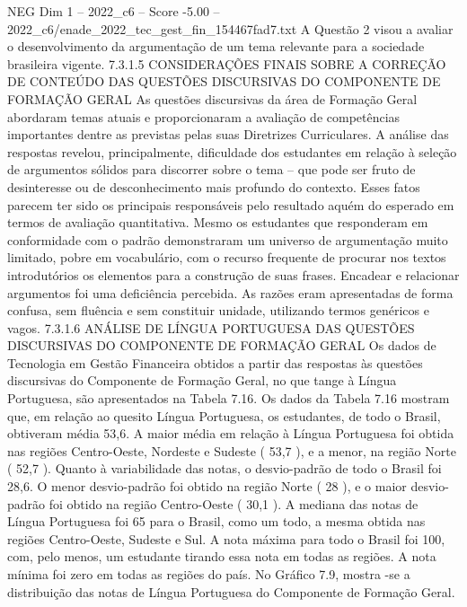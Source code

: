 \begin{textsample}{NEG Dim 1 – 2022\_c6 – Score -5.00 – 2022\_c6/enade\_2022\_tec\_gest\_fin\_154467fad7.txt}
A Questão 2 visou a avaliar o desenvolvimento da argumentação de um tema relevante para a sociedade brasileira vigente. 7.3.1.5 CONSIDERAÇÕES FINAIS SOBRE A CORREÇÃO DE CONTEÚDO DAS QUESTÕES DISCURSIVAS DO COMPONENTE DE FORMAÇÃO GERAL As questões discursivas da área de Formação Geral abordaram temas atuais e proporcionaram a avaliação de competências importantes dentre as previstas pelas suas Diretrizes Curriculares.
A análise das respostas revelou, principalmente, dificuldade dos estudantes em relação à seleção de argumentos sólidos para discorrer sobre o tema – que pode ser fruto de desinteresse ou de desconhecimento mais profundo do contexto.
Esses fatos parecem ter sido os principais responsáveis pelo resultado aquém do esperado em termos de avaliação quantitativa.
Mesmo os estudantes que responderam em conformidade com o padrão demonstraram um universo de argumentação muito limitado, pobre em vocabulário, com o recurso frequente de procurar nos textos introdutórios os elementos para a construção de suas frases.
Encadear e relacionar argumentos foi uma deficiência percebida.
As razões eram apresentadas de forma confusa, sem fluência e sem constituir unidade, utilizando termos genéricos e vagos. 7.3.1.6 ANÁLISE DE LÍNGUA PORTUGUESA DAS QUESTÕES DISCURSIVAS DO COMPONENTE DE FORMAÇÃO GERAL Os dados de Tecnologia em Gestão Financeira obtidos a partir das respostas às questões discursivas do Componente de Formação Geral, no que tange à Língua Portuguesa, são apresentados na Tabela 7.16.
Os dados da Tabela 7.16 mostram que, em relação ao quesito Língua Portuguesa, os estudantes, de todo o Brasil, obtiveram média 53,6.
A maior média em relação à Língua Portuguesa foi obtida nas regiões Centro-Oeste, Nordeste e Sudeste ( 53,7 ), e a menor, na região Norte ( 52,7 ).
Quanto à variabilidade das notas, o desvio-padrão de todo o Brasil foi 28,6.
O menor desvio-padrão foi obtido na região Norte ( 28 ), e o maior desvio-padrão foi obtido na região Centro-Oeste ( 30,1 ).
A mediana das notas de Língua Portuguesa foi 65 para o Brasil, como um todo, a mesma obtida nas regiões Centro-Oeste, Sudeste e Sul.
A nota máxima para todo o Brasil foi 100, com, pelo menos, um estudante tirando essa nota em todas as regiões.
A nota mínima foi zero em todas as regiões do país.
No Gráfico 7.9, mostra -se a distribuição das notas de Língua Portuguesa do Componente de Formação Geral.

\end{textsample}
